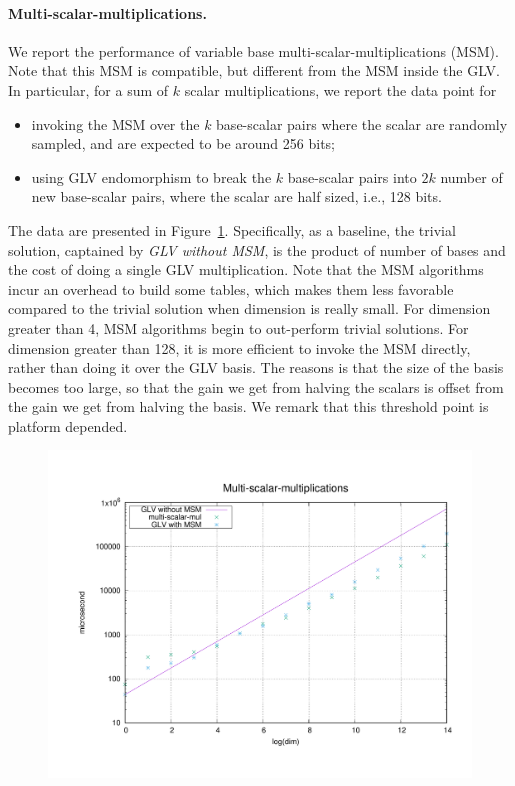 \documentclass{article}
\theoremstyle{definition}
\begin{document}
\paragraph{Multi-scalar-multiplications.}
We report the performance of variable base 
multi-scalar-multiplications (MSM). Note that this MSM is 
compatible, but
different
from the MSM inside the GLV. 
In particular, for a sum of $k$ scalar multiplications,
we report the data point for 
\begin{itemize}
  \item invoking the MSM over the $k$ base-scalar pairs where the
  scalar are randomly sampled, and are expected to be around 256 bits;
  \item using GLV endomorphism to break the $k$ base-scalar pairs into 
  $2k$ number of new base-scalar pairs, where the scalar are half sized,
  i.e., 128 bits.
\end{itemize}
The data are presented in Figure~\ref{fig:msm}. Specifically, 
as a baseline, the trivial solution, captained by 
{\em GLV without 
MSM}, is the product of number of bases and the cost of
doing a single GLV multiplication. 
Note that the MSM algorithms incur an overhead to build some
tables, which makes them less favorable compared to the trivial
solution when dimension is really small. For dimension greater 
than 4, MSM algorithms begin to out-perform trivial solutions.
For dimension greater than 128, it is more efficient to 
invoke the MSM directly, rather than doing it over the GLV basis.
The reasons is that the size of the basis becomes too large, so
that the gain we get from halving the scalars is offset from the
gain we get from halving the basis. We remark that this threshold
point is platform depended.
\begin{figure}[h]\centering \label{fig:msm}
  \includegraphics[width=12cm]{fig/msm.pdf}
\end{figure}
\end{document}
